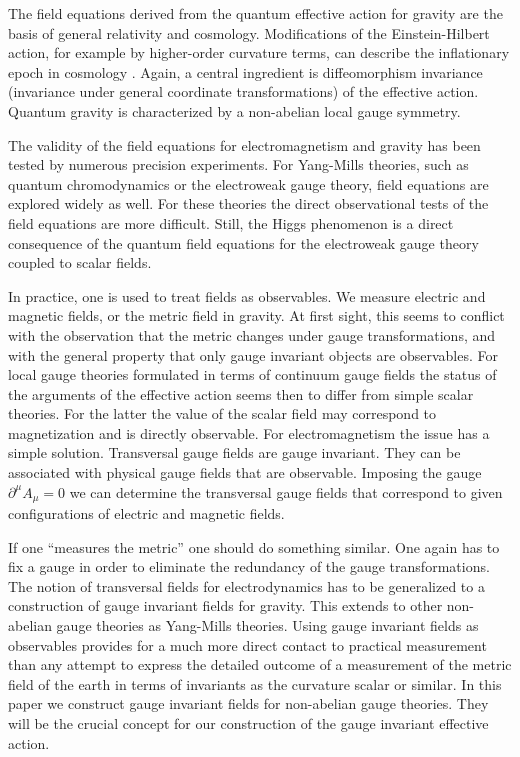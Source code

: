 \documentclass[twocolumn,aps,prd,amsmath,amssymb,preprintnumbers,longbibliography]{revtex4-1}
\numberwithin{equation}{section}
\begin{document}
The field equations derived from the quantum effective action for gravity are the basis of general relativity and cosmology. Modifications of the Einstein-Hilbert action, for example by higher-order curvature terms, can describe the inflationary epoch in cosmology \cite{Sta}. Again, a central ingredient is diffeomorphism invariance (invariance under general coordinate transformations) of the effective action. Quantum gravity is characterized by a non-abelian local gauge symmetry.

The validity of the field equations for electromagnetism and gravity has been tested by numerous precision experiments. For Yang-Mills theories, such as quantum chromodynamics or the electroweak gauge theory, field equations are explored widely as well. For these theories the direct observational tests of the field equations are more difficult. Still, the Higgs phenomenon \cite{Hi,BE} is a direct consequence of the quantum field equations for the electroweak gauge theory coupled to scalar fields.

In practice, one is used to treat fields as observables. We measure electric and magnetic fields, or the metric field in gravity. At first sight, this seems to conflict with the observation that the metric changes under gauge transformations, and with the general property that only gauge invariant objects are observables. For local gauge theories formulated in terms of continuum gauge fields the status of the arguments of the effective action seems then to differ from simple scalar theories. For the latter the value of the scalar field may correspond to magnetization and is directly observable. For electromagnetism the issue has a simple solution. Transversal gauge fields are gauge invariant. They can be associated with physical gauge fields that are observable. Imposing the gauge $\partial^{\mu}A_{\mu}=0$ we can determine the transversal gauge fields that correspond to given configurations of electric and magnetic fields.

If one ``measures the metric'' one should do something similar. One again has to fix a gauge in order to eliminate the redundancy of the gauge transformations. The notion of transversal fields for electrodynamics has to be generalized to a construction of gauge invariant fields for gravity. This extends to other non-abelian gauge theories as Yang-Mills theories. Using gauge invariant fields as observables provides for a much more direct contact to practical measurement than any attempt to express the detailed outcome of a measurement of the metric field of the earth in terms of invariants as the curvature scalar or similar. In this paper we construct gauge invariant fields for non-abelian gauge theories. They will be the crucial concept for our construction of the gauge invariant effective action.
\end{document}
